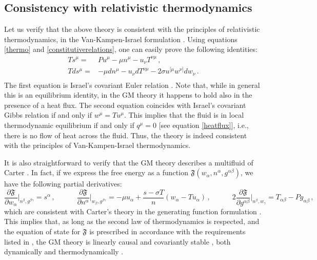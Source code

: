 \documentclass[a4paper, amsfonts, amssymb, amsmath, reprint, showkeys, nofootinbib, twoside, onecolumn, notitlepage]{revtex4-1}
\newcommand{\spc}{\quad \quad \quad}
\newcommand{\F}{{\mathfrak{F}}}
\begin{document}
\subsection{Consistency with relativistic thermodynamics}

Let us verify that the above theory is consistent with the principles of relativistic thermodynamics, in the Van-Kampen-Israel formulation \cite{VanKampen1968,Israel_Stewart_1979,Israel_2009_inbook,GavassinoTermometri,GavassinoLorentzInvariance2022}. Using equations \eqref{thermo} and \eqref{constitutiverelations}, one can easily prove the following identities:
\begin{equation}\label{gibbs}
    \begin{split}
Ts^\mu ={}& Pu^\mu -\mu n^\mu -u_\nu T^{\nu \mu} \, ,\\
Tds^\mu ={}& -\mu dn^\mu -u_\nu dT^{\nu \mu}-2\sigma u^{[\mu}w^{\nu]}dw_\nu \, . \\
    \end{split}
\end{equation}
The first equation is Israel's covariant Euler relation \cite{Israel_2009_inbook}. Note that, while in general this is an equilibrium identity, in the GM theory it happens to hold also in the presence of a heat flux. The second equation coincides with Israel's covariant Gibbs relation if and only if $w^\mu=Tu^\mu$. This implies that the fluid is in local thermodynamic equilibrium if and only if $q^\mu=0$ [see equation \eqref{heatflux}], i.e., there is no flow of heat across the fluid. Thus, the theory is indeed consistent with the principles of Van-Kampen-Israel thermodynamics.

It is also straightforward to verify that the GM theory describes a multifluid of Carter \cite{Carter_starting_point,Termo}. In fact, if we express the free energy as a function $\F(w_\alpha,n^\alpha,g^{\alpha \beta})$, we have the following partial derivatives:
\begin{equation}
\dfrac{\partial \F}{\partial w_\alpha} \bigg|_{n^\beta,g^{\beta \gamma}} = s^\alpha \, , \spc
\dfrac{\partial \F}{\partial n^\alpha} \bigg|_{w_\beta,g^{\beta \gamma}} = -\mu u_\alpha +\dfrac{s{-}\sigma T}{n}(w_\alpha{-}Tu_\alpha) \, , \spc 
2\dfrac{\partial \F}{\partial g^{\alpha\beta}} \bigg|_{n^\beta, w_\gamma} = T_{\alpha \beta}-Pg_{\alpha \beta} \, ,
\end{equation}
which are consistent with Carter's theory in the generating function formulation \cite{GavassinoKhalatnikov2022}. This implies that, as long as the second law of thermodynamics is respected, and the equation of state for $\F$ is prescribed in accordance with the requirements listed in \cite{GavassinoStabilityCarter2022}, the GM theory is linearly causal \cite{GavassinoCausality2021} and covariantly stable \cite{GavassinoGibbs2021}, both dynamically and thermodynamically \cite{PrigoginebookModernThermodynamics2014,Pathria2011}.
\end{document}
